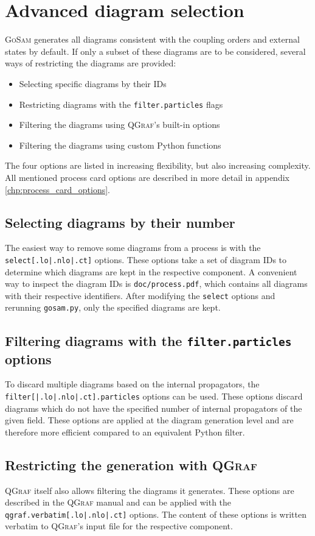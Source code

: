 \documentclass[11pt,a4paper]{refrep}
\newcommand{\gosam}{\textsc{GoSam}\xspace}
\newcommand{\qgraf}{\textsc{QGraf}\xspace}
\newcommand{\python}{{Python}\xspace}
\begin{document}
\chapter{Advanced diagram selection}
\gosam generates all diagrams consistent with the coupling orders and external states by default. If only a subset of these diagrams are to be considered, several ways of restricting the diagrams are provided:
\begin{itemize}
   \item Selecting specific diagrams by their IDs
   \item Restricting diagrams with the \texttt{filter.particles} flags
   \item Filtering the diagrams using \qgraf's built-in options
   \item Filtering the diagrams using custom \python functions
\end{itemize}
The four options are listed in increasing flexibility, but also increasing complexity. All mentioned process card options are described in more detail in appendix \ref{chp:process_card_options}.

\section{Selecting diagrams by their number}
The easiest way to remove some diagrams from a process is with the \texttt{select[.lo|.nlo|.ct]} options. These options take a set of diagram IDs to determine which diagrams are kept in the respective component. A convenient way to inspect the diagram IDs is \texttt{doc/process.pdf}, which contains all diagrams with their respective identifiers. After modifying the \texttt{select} options and rerunning \texttt{gosam.py}, only the specified diagrams are kept. 

\section{Filtering diagrams with the \texttt{filter.particles} options}
To discard multiple diagrams based on the internal propagators, the \texttt{filter[|.lo|.nlo|.ct].particles} options can be used. These options discard diagrams which do not have the specified number of internal propagators of the given field. These options are applied at the diagram generation level and are therefore more efficient compared to an equivalent \python filter.

\section{Restricting the generation with \qgraf}
\qgraf itself also allows filtering the diagrams it generates. These options are described in the \qgraf manual and can be applied with the \texttt{qgraf.verbatim[.lo|.nlo|.ct]} options. The content of these options is written verbatim to \qgraf's input file for the respective component. 
\end{document}

